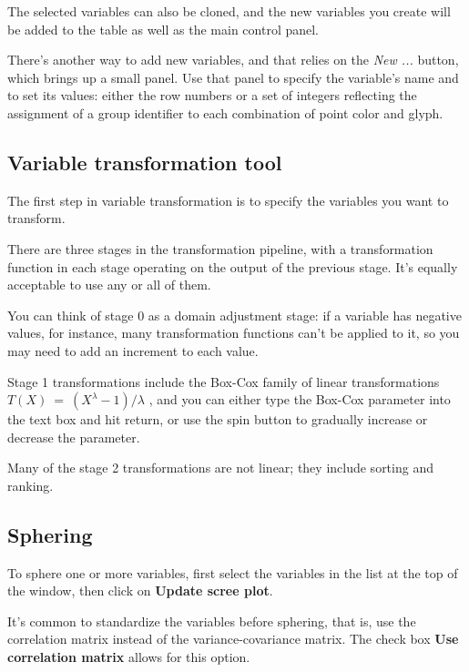 \documentclass[11pt]{article}
\begin{document}
The selected variables can also be cloned, and the new variables
you create will be added to the table as well as the main control panel.

\label{NewVariable}
There's another way to add new variables, and that relies on the {\em New
...} button, which brings up a small panel.  Use that panel to specify
the variable's name and to set its values:  either the row numbers or
a set of integers reflecting the assignment of a group identifier to each
combination of point color and glyph.

\subsection{Variable transformation tool}
\label{slbl:VarTransform}

The first step in variable transformation is to specify the variables
you want to transform.

There are three stages in the transformation pipeline, with a
transformation function in each stage operating on the output of the
previous stage.  It's equally acceptable to use any or all of them.

You can think of stage 0 as a domain adjustment stage:  if a variable
has negative values, for instance, many transformation functions
can't be applied to it, so you may need to add an increment to each
value.

Stage 1 transformations include the Box-Cox family of linear
transformations \( T(X)~=~(X ^ \lambda - 1) / \lambda\) \cite{BoxCox64},
and you can either type the Box-Cox parameter into
the text box and hit return, or use the spin button to gradually
increase or decrease the parameter. 

Many of the stage 2
transformations are not linear; they include sorting and ranking.

\subsection{Sphering}
\label{slbl:Sphering}

To sphere one or more variables, first select the variables in the list
at the top of the window, then click on {\bf Update scree plot}.

It's common to standardize the variables before sphering, that is, use
the correlation matrix instead of the variance-covariance matrix. The
check box {\bf Use correlation matrix} allows for this option.
\end{document}
